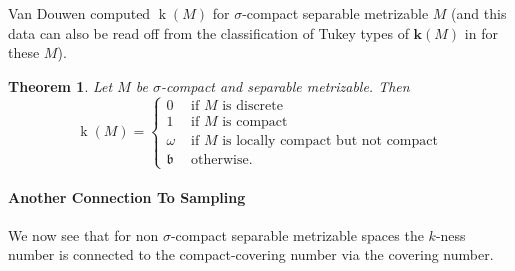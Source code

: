 \documentclass{article}
\newtheorem{thm}{Theorem}[section]
\begin{document}
Van Douwen computed $\mathop{k}(M)$ for $\sigma$-compact separable metrizable $M$ (and this data can also be read off from the classification of Tukey types of $\mathbf{k}(M)$ in \cite{FG_Shape} for these $M$). 

\begin{thm}
    Let $M$ be $\sigma$-compact and separable metrizable. Then
\[
\mathop{k}(M) = 
\begin{cases}
  0 & \text{ if $M$ is discrete} \\
  1 & \text{ if $M$ is compact} \\
  \omega & \text{ if $M$ is locally compact but not compact} \\ 
  \mathfrak{b} & \text{ otherwise.}
\end{cases}
\]    
\end{thm}

\paragraph{Another Connection To Sampling}

We now see that for non $\sigma$-compact separable metrizable spaces the $k$-ness number is connected to the compact-covering number via the covering number.
\end{document}
